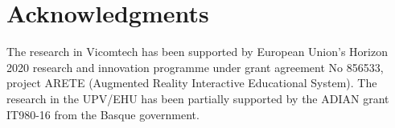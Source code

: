 \section*{Acknowledgments}
The research in Vicomtech has been supported by European Union’s Horizon 2020 research and innovation programme under grant agreement No 856533, project ARETE (Augmented Reality Interactive Educational System).
The research in the UPV/EHU has been partially supported by the ADIAN grant IT980-16 from the Basque government.
